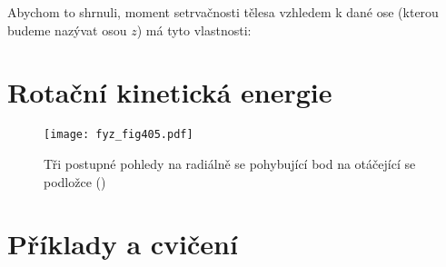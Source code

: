     Abychom to shrnuli, moment setrvačnosti tělesa vzhledem k dané ose (kterou budeme nazývat osou
    \(z\)) má tyto vlastnosti:
    

  \section{Rotační kinetická energie}\label{fyz:IchapXIXsecIV}

      \begin{figure}[ht!] %
        \centering
        \texttt{[image: fyz\_fig405.pdf]}
        \caption{Tři postupné pohledy na radiálně se pohybující bod na otáčející se podložce
                (\cite[s.~269]{Feynman01})}
        \label{fyz:fig405}
      \end{figure}
  \section{Příklady a cvičení}\label{fyz:IchapXIXsecV}

